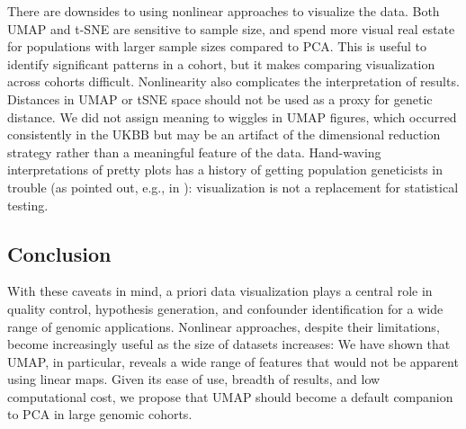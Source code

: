 \documentclass[12pt]{pnas-new}
\begin{document}
There are downsides to using nonlinear approaches to visualize the data. Both UMAP and t-SNE are sensitive to sample size, and spend more visual real estate for populations with larger sample sizes compared to PCA. This is useful to identify significant patterns in a cohort, but it makes comparing visualization across cohorts difficult. Nonlinearity also complicates the interpretation of results. Distances in UMAP or tSNE space should not be used as a proxy for genetic distance. We did not assign meaning to wiggles in UMAP figures, which occurred consistently in the UKBB but may be an artifact of the dimensional reduction strategy rather than a meaningful feature of the data. Hand-waving interpretations of pretty plots has a history of getting population geneticists in trouble (as pointed out, e.g., in \cite{novembre2008interpreting}): visualization is not a replacement for statistical testing.       

\subsection*{Conclusion}
With these caveats in mind, a priori data visualization plays a central role in quality control, hypothesis generation, and confounder identification for a wide range of genomic applications. Nonlinear approaches, despite their limitations, become increasingly useful as the size of datasets increases: We have shown that UMAP, in particular, reveals a wide range of features that would not be apparent using linear maps. Given its ease of use, breadth of results, and low computational cost, we propose that UMAP should become a default companion to PCA in large genomic cohorts.
\end{document}
